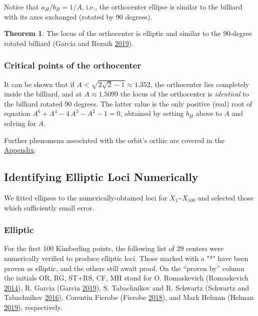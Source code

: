 \documentclass[]{article}
\begin{document}
Notice that \(a_H/b_H=1/A\), i.e., the orthocenter ellipse is similar to the billiard with its axes exchanged (rotated by 90 degrees).

\textbf{Theorem 1}: The locus of the orthocenter is elliptic and similar to the 90-degree rotated billiard (Garcia and Reznik \protect\hyperlink{ref-garcia19a}{2019}).

\hypertarget{critical-points-of-the-orthocenter}{%
\subsubsection{Critical points of the orthocenter}\label{critical-points-of-the-orthocenter}}

It can be shown that if \(A<\sqrt{2 \sqrt{2}-1}\approx 1.352\), the orthocenter lies completely inside the billiard, and at \(A\approx 1.5099\) the locus of the orthocenter is \emph{identical} to the billiard rotated 90 degrees. The latter value is the only positive (real) root of equation \(A^6 + A^4 - 4\,A^3-A^2-1=0\), obtained by setting \(b_H\) above to \(A\) and solving for \(A\).

Further phenomena associated with the orbit's orthic are covered in the \href{appendices.html}{Appendix}.

\hypertarget{identifying-elliptic-loci-numerically}{%
\subsection{Identifying Elliptic Loci Numerically}\label{identifying-elliptic-loci-numerically}}

We fitted ellipses to the numerically-obtained loci for \(X_1\)\textasciitilde{}\(X_{100}\) and selected those which sufficiently small error.

\hypertarget{elliptic}{%
\subsubsection{Elliptic}\label{elliptic}}

For the first 100 Kimberling points, the following list of \(29\) centers were numerically verified to produce elliptic loci. Those marked with a "*" have been proven as elliptic, and the others still await proof. On the ``proven by'' column the initials OR, RG, ST+RS, CF, MH stand for O. Romaskevich (Romaskevich \protect\hyperlink{ref-olga14}{2014}), R. Garcia (Garcia \protect\hyperlink{ref-ronaldo19}{2019}), S. Tabachnikov and R. Schwartz (Schwartz and Tabachnikov \protect\hyperlink{ref-sergei2016}{2016}), Corentin Fierobe (Fierobe \protect\hyperlink{ref-corentin19}{2018}), and Mark Helman (Helman \protect\hyperlink{ref-helman19}{2019}), respectively.
\end{document}
